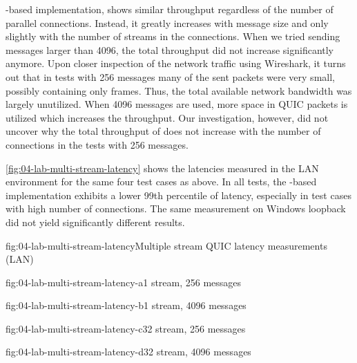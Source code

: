 \libmsquic{}-based implementation, shows similar throughput regardless of the number of parallel
connections. Instead, it greatly increases with message size and only slightly with the number of
streams in the connections. When we tried sending messages larger than \SI{4096}{\byte}, the total
throughput did not increase significantly anymore. Upon closer inspection of the \libmsquic{}
network traffic using Wireshark, it turns out that in tests with \SI{256}{\byte} messages many of
the sent packets were very small, possibly containing only \ACK{} frames. Thus, the total available
network bandwidth was largely unutilized. When \SI{4096}{\byte} messages are used, more space in
QUIC packets is utilized which increases the throughput. Our investigation, however, did not uncover
why the total throughput of \libmsquic{} does not increase with the number of connections in the
tests with \SI{256}{\byte} messages.

\autoref{fig:04-lab-multi-stream-latency} shows the latencies measured in the LAN environment for
the same four test cases as above. In all tests, the \libmsquic{}-based implementation exhibits a
lower 99th percentile of latency, especially in test cases with high number of connections. The same
measurement on Windows loopback did not yield significantly different results.

\begin{myFigure}{fig:04-lab-multi-stream-latency}{Multiple stream QUIC latency measurements (LAN)}
\begin{mySubfigure}{0.49\linewidth}{fig:04-lab-multi-stream-latency-a}{1 stream, \SI{256}{\byte} messages}
\footnotesize

\end{mySubfigure}
\begin{mySubfigure}{0.49\linewidth}{fig:04-lab-multi-stream-latency-b}{1 stream, \SI{4096}{\byte} messages}
\footnotesize

\end{mySubfigure}

\begin{mySubfigure}{0.49\linewidth}{fig:04-lab-multi-stream-latency-c}{32 stream, \SI{256}{\byte} messages}
\footnotesize

\end{mySubfigure}
\begin{mySubfigure}{0.49\linewidth}{fig:04-lab-multi-stream-latency-d}{32 stream, \SI{4096}{\byte} messages}
\footnotesize

\end{mySubfigure}
\end{myFigure}

